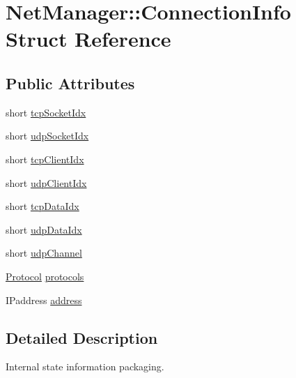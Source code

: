\hypertarget{structNetManager_1_1ConnectionInfo}{\section{Net\-Manager\-:\-:Connection\-Info Struct Reference}
\label{structNetManager_1_1ConnectionInfo}
}
\subsection*{Public Attributes}
\begin{DoxyCompactItemize}
\item 
short \hyperlink{structNetManager_1_1ConnectionInfo_adec7ce2d1065f2d024e3d676d80403af}{tcp\-Socket\-Idx}
\item 
short \hyperlink{structNetManager_1_1ConnectionInfo_a408661ba927eb5ba51871f97e3c05c0c}{udp\-Socket\-Idx}
\item 
short \hyperlink{structNetManager_1_1ConnectionInfo_a390aac4c705a93cce4c52e08b76dd069}{tcp\-Client\-Idx}
\item 
short \hyperlink{structNetManager_1_1ConnectionInfo_ac396f741ea17871fb5789160a5083834}{udp\-Client\-Idx}
\item 
short \hyperlink{structNetManager_1_1ConnectionInfo_a391068e7350c17c157e3350ca97276e1}{tcp\-Data\-Idx}
\item 
short \hyperlink{structNetManager_1_1ConnectionInfo_a12695be39254f2558420322989c93b81}{udp\-Data\-Idx}
\item 
short \hyperlink{structNetManager_1_1ConnectionInfo_a4fe7f6a4976e2b4c7bb52d14c540f662}{udp\-Channel}
\item 
\hyperlink{NetManager_8h_a9af285d1232beed01f31aac5d3a5469f}{Protocol} \hyperlink{structNetManager_1_1ConnectionInfo_a24effad095fc7ed4ab1a774754676be4}{protocols}
\item 
I\-Paddress \hyperlink{structNetManager_1_1ConnectionInfo_a7783e4a019bdc7a86fa79d0b4fc3c908}{address}
\end{DoxyCompactItemize}


\subsection{Detailed Description}
Internal state information packaging. 

